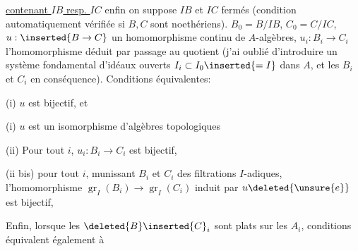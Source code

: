 
\uline{contenant $IB$ resp. $IC$}\inserted{]}\unsure{,} enfin on suppose $IB$ et $IC$ fermés (condition automatiquement vérifiée si $B,C$ sont noethériens).  $B_0=B/IB$, $C_0=C/IC$, $u:\inserted{B\to C}$ un homomorphisme continu de $A$-algèbres, $u_i:B_i\to C_i$ l'homomorphisme  déduit par passage au quotient (j'ai oublié d'introduire un système fondamental d'idéaux ouverts $I_i\subset I_0\inserted{=I}$ dans $A$, et les $B_i$ et $C_i$ en conséquence). Conditions équivalentes:

(i) $u$ est  bijectif, et 

(i) $u$ est un isomorphisme d'algèbres topologiques

(ii) Pour tout $i$, $u_i:B_i\to C_i$ est bijectif, 

(ii bis) pour tout $i$, munissant $B_i$ et $C_i$ des filtrations $I$-adiques, l'homomorphisme $\operatorname{gr}_I(B_i)\to\operatorname{gr}_I(C_i)$ induit par $u\deleted{\unsure{e}}$ est bijectif, 


Enfin, lorsque les $\deleted{B}\inserted{C}_i$ sont plats sur les $A_i$,  conditions équivalent également à


